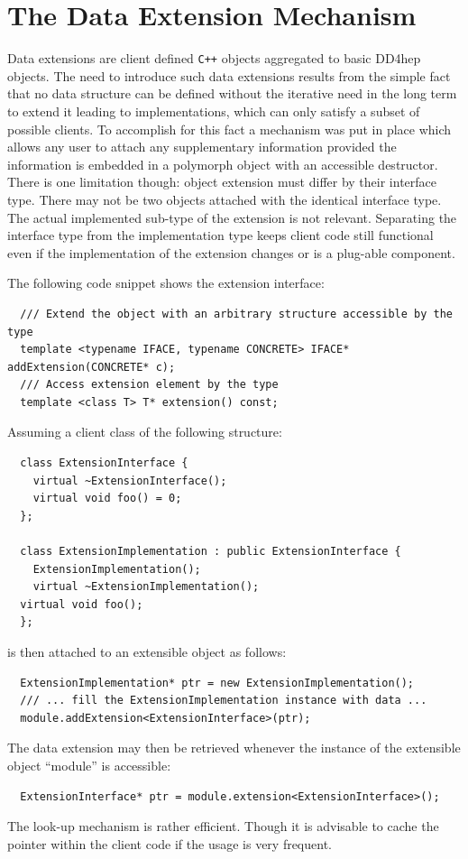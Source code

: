 \section{The Data Extension Mechanism}
\label{sec:dd4hep-user-manual-data-extensions}

Data extensions are client defined \texttt{C++} objects aggregated to basic DD4hep objects. The need to introduce such data extensions results from the simple fact that no data structure can be defined without the iterative need in the long term to extend it leading to implementations, which can only satisfy a subset of possible clients. To accomplish for this fact a mechanism was put in place which allows any user to attach any supplementary information provided the information is embedded in a polymorph object with an accessible destructor. There is one limitation though: object extension must differ by their interface type. There may not be two objects attached with the identical interface type. The actual implemented sub-type of the extension is not relevant. Separating the interface type from the implementation type keeps client code still functional even if the implementation of the extension changes 
or is a plug-able component.

The following code snippet shows the extension interface:

\begin{verbatim}
  /// Extend the object with an arbitrary structure accessible by the type
  template <typename IFACE, typename CONCRETE> IFACE* addExtension(CONCRETE* c);
  /// Access extension element by the type
  template <class T> T* extension() const;
\end{verbatim}

Assuming a client class of the following structure:
\begin{verbatim}
  class ExtensionInterface {
    virtual ~ExtensionInterface();
    virtual void foo() = 0;
  };

  class ExtensionImplementation : public ExtensionInterface {
    ExtensionImplementation();
    virtual ~ExtensionImplementation();
  virtual void foo();
  };
\end{verbatim}
is then attached to an extensible object as follows:
\begin{verbatim}
  ExtensionImplementation* ptr = new ExtensionImplementation();
  /// ... fill the ExtensionImplementation instance with data ...
  module.addExtension<ExtensionInterface>(ptr);
\end{verbatim}
The data extension may then be retrieved whenever the instance of the extensible object ``module'' is accessible:
\begin{verbatim}
  ExtensionInterface* ptr = module.extension<ExtensionInterface>();
\end{verbatim}
The look-up mechanism is rather efficient. Though it is advisable to cache the pointer within the client code if the usage is very frequent.

